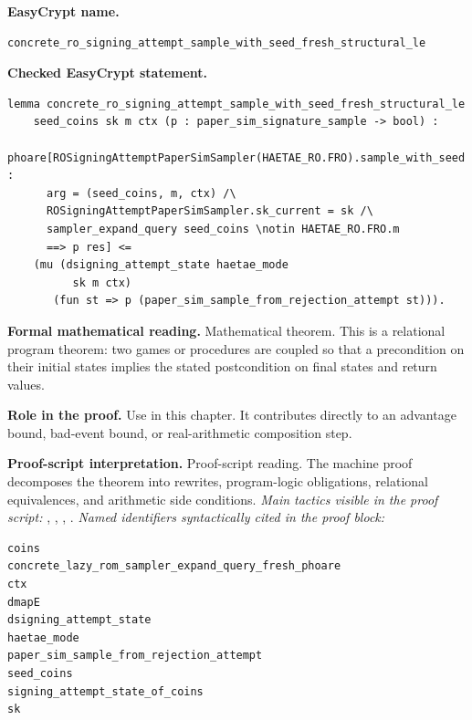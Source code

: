 \begin{formaltheorem}
\noindent\textbf{EasyCrypt name.}
\begin{lstlisting}[language=EasyCrypt,basicstyle=\ttfamily\scriptsize]
concrete_ro_signing_attempt_sample_with_seed_fresh_structural_le
\end{lstlisting}
\noindent\textbf{Checked EasyCrypt statement.}
\begin{lstlisting}[language=EasyCrypt,basicstyle=\ttfamily\scriptsize]
lemma concrete_ro_signing_attempt_sample_with_seed_fresh_structural_le
    seed_coins sk m ctx (p : paper_sim_signature_sample -> bool) :
  phoare[ROSigningAttemptPaperSimSampler(HAETAE_RO.FRO).sample_with_seed :
      arg = (seed_coins, m, ctx) /\
      ROSigningAttemptPaperSimSampler.sk_current = sk /\
      sampler_expand_query seed_coins \notin HAETAE_RO.FRO.m
      ==> p res] <=
    (mu (dsigning_attempt_state haetae_mode
          sk m ctx)
       (fun st => p (paper_sim_sample_from_rejection_attempt st))).
\end{lstlisting}
\noindent\textbf{Formal mathematical reading.}
Mathematical theorem. This is a relational program theorem: two games or procedures are coupled so that a precondition on their initial states implies the stated postcondition on final states and return values.

\noindent\textbf{Role in the proof.}
Use in this chapter. It contributes directly to an advantage bound, bad-event bound, or real-arithmetic composition step.

\noindent\textbf{Proof-script interpretation.}
Proof-script reading. The machine proof decomposes the theorem into rewrites, program-logic obligations, relational equivalences, and arithmetic side conditions.
\emph{Main tactics visible in the proof script:} , , , .
\emph{Named identifiers syntactically cited in the proof block:}
\begin{lstlisting}[language=EasyCrypt,basicstyle=\ttfamily\scriptsize]
coins
concrete_lazy_rom_sampler_expand_query_fresh_phoare
ctx
dmapE
dsigning_attempt_state
haetae_mode
paper_sim_sample_from_rejection_attempt
seed_coins
signing_attempt_state_of_coins
sk
\end{lstlisting}

\end{formaltheorem}

